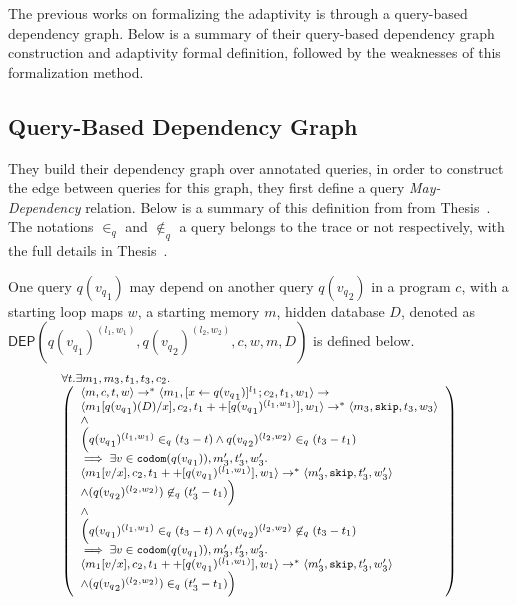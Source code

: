 The previous works on formalizing the adaptivity is through a query-based dependency graph.
Below is a summary of their query-based dependency graph construction and adaptivity formal definition, followed
by the weaknesses of this formalization method.
\subsection*{Query-Based Dependency Graph}
They build their dependency graph over annotated queries, in order to construct the edge between queries for this graph, they first
define a query \emph{May-Dependency} relation. Below is a summary of this definition from
from Thesis~\cite{weihao22}.
The notations $\in_q$ and $\not\in_q$ a query belongs to the trace or not respectively, with the full details in Thesis~\cite{weihao22}.
\begin{defn}
One query $q({v_q}_1)$ may depend on another query $q({v_q}_2)$ in a program $c$, with a starting loop maps $w$, a starting memory $m$, hidden database $D$, denoted as \\
$\mathsf{DEP}(q({v_q}_1)^{(l_1, w_1)}, q({v_q}_2)^{(l_2, w_2)}, c,w, m, D)$ is defined below. 
\[
  {\footnotesize
\begin{array}{l}
\forall  t. \exists m_1,m_3,t_1,t_3,c_2.\\
  \left (\begin{array}{l}   
\config{m, c,  t,w} \rightarrow^{*} \config{m_1, [\assign{x}{q({v_q}_1)}]^{l_1} ; c_2,
  t_1,w_1} \rightarrow \\ \config{m_1[q({v_q}_1)(D)/x], c_2,
  t_1++[q({v_q}_1)^{(l_1, w_1)}], w_1} \rightarrow^{*} \config{m_3, \eskip,
  t_3,w_3} \\  
  \land \\
\Big( q({v_q}_1)^{(l_1,w_1)} \in_{q} (t_3-t) \land q({v_q}_2)^{(l_2,w_2)} \in_{q} (t_3-t_1) \\ \implies  \exists v \in \codom(q({v_q}_1)), m_3', t_3', w_3'.  \\
 \config{m_1[v/x], {c_2}, t_1++[q({v_q}_1)^{(l_1,w_1)}], w_1} \rightarrow^{*} \config{m_3', \eskip, t_3', w_3'} \\ \land (q({v_q}_2)^{(l_2,w_2)}) \not \in_{q} (t_3'-t_1)
\Big)\\
\land \\
\Big(q({v_q}_1)^{(l_1,w_1)} \in_{q} (t_3-t) \land q({v_q}_2)^{(l_2,w_2)} \not\in_{q} (t_3-t_1) \\ \implies  \exists v \in \codom(q({v_q}_1)),  m_3', t_3', w_3'. \\
 \config{m_1[v/x], {c_2}, t_1++[q({v_q}_1)^{(l_1,w_1)}], w_1} \rightarrow^{*} \config{m_3', \eskip, t_3', w_3'} \\ \land (q({v_q}_2)^{(l_2,w_2)})  \in_{q} (t_3'-t_1)
\Big)
\end{array} \right )
\end{array}
}
\]
\end{defn}
